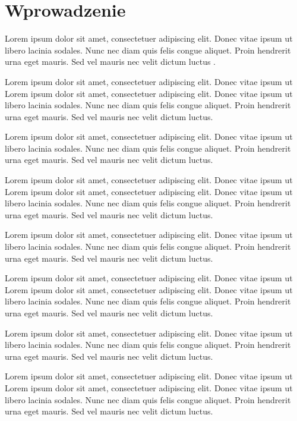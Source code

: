 \chapter{Wprowadzenie}

Lorem ipsum dolor sit amet, consectetuer adipiscing elit. Donec vitae ipsum ut
libero lacinia sodales. Nunc nec diam quis felis congue aliquet. Proin hendrerit
urna eget mauris. Sed vel mauris nec velit dictum luctus
\cite{diduce:DiduceBugs}.

Lorem ipsum dolor sit amet, consectetuer adipiscing elit. Donec vitae ipsum ut
Lorem ipsum dolor sit amet, consectetuer adipiscing elit. Donec vitae ipsum ut
libero lacinia sodales. Nunc nec diam quis felis congue aliquet. Proin hendrerit
urna eget mauris. Sed vel mauris nec velit dictum luctus.

Lorem ipsum dolor sit amet, consectetuer adipiscing elit. Donec vitae ipsum ut
libero lacinia sodales. Nunc nec diam quis felis congue aliquet. Proin hendrerit
urna eget mauris. Sed vel mauris nec velit dictum luctus.

Lorem ipsum dolor sit amet, consectetuer adipiscing elit. Donec vitae ipsum ut
Lorem ipsum dolor sit amet, consectetuer adipiscing elit. Donec vitae ipsum ut
libero lacinia sodales. Nunc nec diam quis felis congue aliquet. Proin hendrerit
urna eget mauris. Sed vel mauris nec velit dictum luctus.

Lorem ipsum dolor sit amet, consectetuer adipiscing elit. Donec vitae ipsum ut
libero lacinia sodales. Nunc nec diam quis felis congue aliquet. Proin hendrerit
urna eget mauris. Sed vel mauris nec velit dictum luctus.

Lorem ipsum dolor sit amet, consectetuer adipiscing elit. Donec vitae ipsum ut
Lorem ipsum dolor sit amet, consectetuer adipiscing elit. Donec vitae ipsum ut
libero lacinia sodales. Nunc nec diam quis felis congue aliquet. Proin hendrerit
urna eget mauris. Sed vel mauris nec velit dictum luctus.

Lorem ipsum dolor sit amet, consectetuer adipiscing elit. Donec vitae ipsum ut
libero lacinia sodales. Nunc nec diam quis felis congue aliquet. Proin hendrerit
urna eget mauris. Sed vel mauris nec velit dictum luctus.

Lorem ipsum dolor sit amet, consectetuer adipiscing elit. Donec vitae ipsum ut
Lorem ipsum dolor sit amet, consectetuer adipiscing elit. Donec vitae ipsum ut
libero lacinia sodales. Nunc nec diam quis felis congue aliquet. Proin hendrerit
urna eget mauris. Sed vel mauris nec velit dictum luctus.

